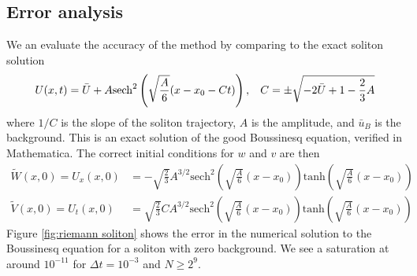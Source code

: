 \documentclass[12pt]{article}
\newcommand{\sech}[0]{\mathrm{sech}}
\numberwithin{equation}{section}
\begin{document}
\subsection{Error analysis}
We an evaluate the accuracy of the method by comparing to the exact soliton solution
\begin{align}
    U(x,t) = \bar U + A\sech^2\left(\sqrt{\frac{A}{6}}(x-x_0-Ct)\right), \hspace{3mm} C = \pm \sqrt{-2\bar U +1-\frac{2}{3}A} \label{soliton exact solution}
\end{align}
where $1/C$ is the slope of the soliton trajectory, $A$ is the amplitude, and $\bar u_B$ is the background. This is an exact solution of the good Boussinesq equation, verified in Mathematica. The correct initial conditions for $w$ and $v$ are then 
\begin{subequations}
    \begin{align}
        \tilde{W}(x,0) = U_x(x,0) &= -\sqrt{\frac{2}{3}}A^{3/2}\sech^2\left(\sqrt{\frac{A}{6}}(x-x_0)\right)\mathrm{tanh}\left(\sqrt{\frac{A}{6}}(x-x_0)\right) \\
        \tilde{V}(x,0) = U_t(x,0) &= \sqrt{\frac{2}{3}}CA^{3/2}\sech^2\left(\sqrt{\frac{A}{6}}(x-x_0)\right)\mathrm{tanh}\left(\sqrt{\frac{A}{6}}(x-x_0)\right)
    \end{align} \label{initial cond w and v}
\end{subequations} 
Figure \ref{fig:riemann soliton} shows the error in the numerical solution to the Boussinesq equation for a soliton with zero background. We see a saturation at around $10^{-11}$ for $\Delta t = 10^{-3}$ and $N \geq 2^9$.
\end{document}
